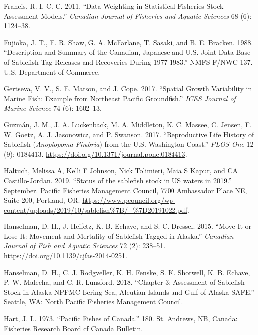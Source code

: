 \documentclass[11pt,
  english,
  a4paper,
]{article}
\begin{document}
\begin{cslreferences}
\leavevmode\hypertarget{ref-Francis2011}{}%
Francis, R. I. C. C. 2011. ``Data Weighting in Statistical Fisheries Stock Assessment Models.'' \emph{Canadian Journal of Fisheries and Aquatic Sciences} 68 (6): 1124--38.

\leavevmode\hypertarget{ref-fujioka1988docdescription}{}%
Fujioka, J. T., F. R. Shaw, G. A. McFarlane, T. Sasaki, and B. E. Bracken. 1988. ``Description and Summary of the Canadian, Japanese and U.S. Joint Data Base of Sablefish Tag Releases and Recoveries During 1977-1983.'' NMFS F/NWC-137. U.S. Department of Commerce.

\leavevmode\hypertarget{ref-gertseva2017icesjmsspatial}{}%
Gertseva, V. V., S. E. Matson, and J. Cope. 2017. ``Spatial Growth Variability in Marine Fish: Example from Northeast Pacific Groundfish.'' \emph{ICES Journal of Marine Science} 74 (6): 1602--13.

\leavevmode\hypertarget{ref-guzman2017}{}%
Guzmán, J. M., J. A. Luckenback, M. A. Middleton, K. C. Massee, C. Jensen, F. W. Goetz, A. J. Jasonowicz, and P. Swanson. 2017. ``Reproductive Life History of Sablefish (\emph{Anoplopoma Fimbria}) from the U.S. Washington Coast.'' \emph{PLOS One} 12 (9): 0184413. \url{https://doi.org/10.1371/journal.pone.0184413}.

\leavevmode\hypertarget{ref-Haltuch2019b}{}%
Haltuch, Melissa A, Kelli F Johnson, Nick Tolimieri, Maia S Kapur, and CA Castillo-Jordan. 2019. ``Status of the sablefish stock in US waters in 2019.'' September. Pacific Fisheries Management Council, 7700 Ambassador Place NE, Suite 200, Portland, OR. \url{https://www.pcouncil.org/wp-content/uploads/2019/10/sablefish\%7B/_\%7D20191022.pdf}.

\leavevmode\hypertarget{ref-hanselman2015cjfasmove}{}%
Hanselman, D. H., J. Heifetz, K. B. Echave, and S. C. Dressel. 2015. ``Move It or Lose It: Movement and Mortality of Sablefish Tagged in Alaska.'' \emph{Canadian Journal of Fish and Aquatic Sciences} 72 (2): 238--51. \url{https://doi.org/10.1139/cjfas-2014-0251}.

\leavevmode\hypertarget{ref-hanselman2018}{}%
Hanselman, D. H., C. J. Rodgveller, K. H. Fenske, S. K. Shotwell, K. B. Echave, P. W. Malecha, and C. R. Lunsford. 2018. ``Chapter 3: Assessment of Sablefish Stock in Alaska NPFMC Bering Sea, Aleutian Islands and Gulf of Alaska SAFE.'' Seattle, WA: North Pacific Fisheries Management Council.

\leavevmode\hypertarget{ref-hart1973}{}%
Hart, J. L. 1973. ``Pacific Fishes of Canada.'' 180. St. Andrews, NB, Canada: Fisheries Research Board of Canada Bulletin.


\end{cslreferences}
\end{document}
